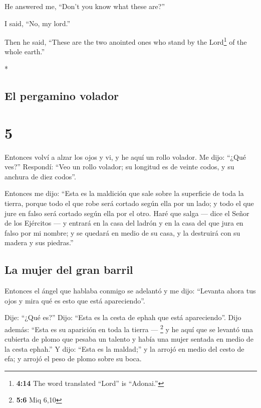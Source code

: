 \begin{paracol}{2}
\begin{otherlanguage}{english}
 He answered me, ``Don't you know what these are?''

I said, ``No, my lord.''

 Then he said, ``These are the two anointed ones who
stand by the Lord\footnote{\textbf{4:14} The word translated ``Lord'' is
  ``Adonai.''} of the whole earth.''

\end{otherlanguage}

\switchcolumn[0]*

\hypertarget{el-pergamino-volador}{%
\subsection{El pergamino volador}\label{el-pergamino-volador}}

\hypertarget{section-8}{%
\section{5}\label{section-8}}

 Entonces volví a alzar los ojos y vi, y he aquí un rollo
volador.  Me dijo: ``¿Qué ves?'' Respondí: ``Veo un rollo
volador; su longitud es de veinte codos, y su anchura de diez codos''.

 Entonces me dijo: ``Esta es la maldición que sale sobre
la superficie de toda la tierra, porque todo el que robe será cortado
según ella por un lado; y todo el que jure en falso será cortado según
ella por el otro.  Haré que salga --- dice el Señor de los
Ejércitos --- y entrará en la casa del ladrón y en la casa del que jura
en falso por mi nombre; y se quedará en medio de su casa, y la destruirá
con su madera y sus piedras.''

\hypertarget{la-mujer-del-gran-barril}{%
\subsection{La mujer del gran barril}\label{la-mujer-del-gran-barril}}

 Entonces el ángel que hablaba conmigo se adelantó y me
dijo: ``Levanta ahora tus ojos y mira qué es esto que está
apareciendo''.

 Dije: ``¿Qué es?'' Dijo: ``Esta es la cesta de ephah que
está apareciendo''. Dijo además: ``Esta es su aparición en toda la
tierra --- \footnote{\textbf{5:6} Miq 6,10}  y he aquí que
se levantó una cubierta de plomo que pesaba un talento y había una mujer
sentada en medio de la cesta ephah.''  Y dijo: ``Esta es
la maldad;'' y la arrojó en medio del cesto de efa; y arrojó el peso de
plomo sobre su boca.


\end{paracol}
